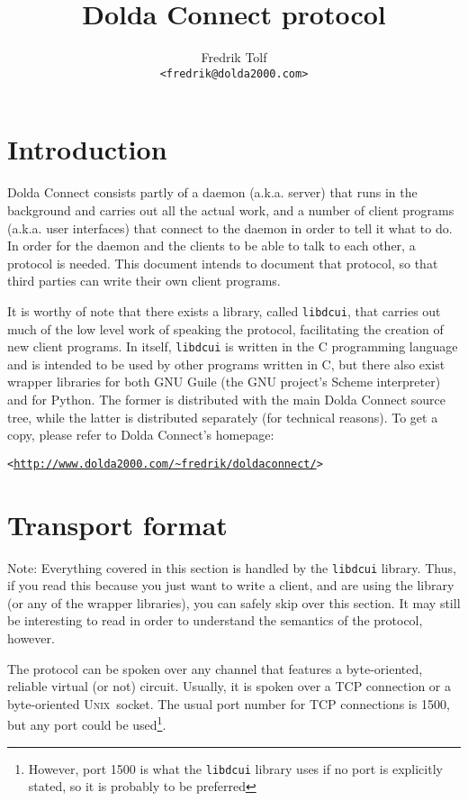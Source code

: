 \documentclass[twoside,a4paper,11pt]{article}
\title{Dolda Connect protocol}
\author{Fredrik Tolf\\\texttt{<fredrik@dolda2000.com>}}
\newcommand{\urlink}[1]{\texttt{<\url{#1}>}}
\newcommand{\unix}{\textsc{Unix}}
\begin{document}
\maketitle

\tableofcontents

\section{Introduction}
Dolda Connect consists partly of a daemon (a.k.a. server) that runs in
the background and carries out all the actual work, and a number of
client programs (a.k.a. user interfaces) that connect to the daemon in
order to tell it what to do. In order for the daemon and the clients
to be able to talk to each other, a protocol is needed. This document
intends to document that protocol, so that third parties can write
their own client programs.

It is worthy of note that there exists a library, called
\texttt{libdcui}, that carries out much of the low level work of
speaking the protocol, facilitating the creation of new client
programs. In itself, \texttt{libdcui} is written in the C programming
language and is intended to be used by other programs written in C,
but there also exist wrapper libraries for both GNU Guile (the GNU
project's Scheme interpreter) and for Python. The former is
distributed with the main Dolda Connect source tree, while the latter
is distributed separately (for technical reasons). To get a copy,
please refer to Dolda Connect's homepage:

\urlink{http://www.dolda2000.com/~fredrik/doldaconnect/}

\section{Transport format}
Note: Everything covered in this section is handled by the
\texttt{libdcui} library. Thus, if you read this because you just want
to write a client, and are using the library (or any of the wrapper
libraries), you can safely skip over this section. It may still be
interesting to read in order to understand the semantics of the
protocol, however.

The protocol can be spoken over any channel that features a
byte-oriented, reliable virtual (or not) circuit. Usually, it is
spoken over a TCP connection or a byte-oriented \unix\ socket. The
usual port number for TCP connections is 1500, but any port could be
used\footnote{However, port 1500 is what the \texttt{libdcui} library
  uses if no port is explicitly stated, so it is probably to be
  preferred}.
\end{document}
